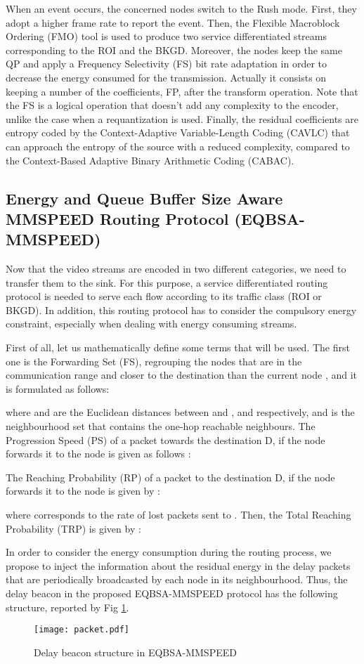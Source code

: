\documentclass[conference,a4paper]{IEEEtran}
\begin{document}
When an event occurs, the concerned nodes switch to the Rush mode. First, they adopt a higher frame rate to report the event. Then, the Flexible Macroblock Ordering (FMO) tool is used to produce two service differentiated streams corresponding to the ROI and the BKGD. Moreover, the nodes keep the same QP and apply a Frequency Selectivity (FS) bit rate adaptation in order to decrease the energy consumed for the transmission. Actually it consists on keeping a number of the coefficients, FP, after the transform operation. Note that the FS is a logical operation that doesn't add any complexity to the encoder, unlike the case when a requantization is used. Finally, the residual coefficients are entropy coded by the Context-Adaptive Variable-Length Coding (CAVLC) that can approach the entropy of the source with a reduced complexity, compared to the Context-Based Adaptive Binary Arithmetic Coding (CABAC). 
\subsection{Energy and Queue Buffer Size Aware MMSPEED Routing Protocol (EQBSA-MMSPEED)}
 Now that the video streams are encoded in two different categories, we need to transfer them to the sink.  For this purpose, a service differentiated routing protocol is needed to serve each flow according to its traffic class (ROI or BKGD). In addition, this routing protocol has to consider the compulsory energy constraint,  especially when dealing with energy consuming streams. 

First of all, let us mathematically define some terms that will be used. The first one is the Forwarding Set (FS), regrouping the nodes that are in the communication range and closer to the destination  than the current node , and it is formulated as follows:

where  and  are the Euclidean distances between  and ,  and  respectively, and  is the neighbourhood set that contains the one-hop reachable neighbours. The Progression Speed (PS) of a packet towards the destination D, if the node  forwards it to the node  is given as follows \cite{mmspeed} :
  
The Reaching Probability (RP) of a packet to the destination D, if the node  forwards it to the node  is given by \cite{mmspeed}: 

where  corresponds to the rate of lost packets sent to . Then, the Total Reaching Probability (TRP) is given by \cite{mmspeed}:
 

In order to consider the energy consumption during the routing process, we propose to inject the information about the residual energy in the delay packets that are periodically broadcasted by each node in its neighbourhood. Thus, the delay beacon in the proposed EQBSA-MMSPEED protocol has the following structure, reported by Fig \ref{packet}. 
\begin{figure}[htb]
\centering \texttt{[image: packet.pdf]}
\caption{Delay beacon structure in EQBSA-MMSPEED}
\label{packet}
\end{figure}
\end{document}
